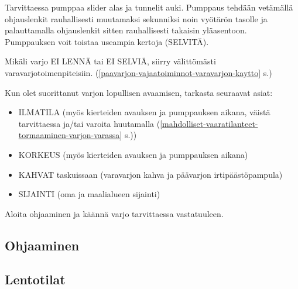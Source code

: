 \begin{multicols}{2}
Tarvittaessa pumppaa slider alas ja tunnelit auki. Pumppaus tehdään vetämällä ohjauslenkit rauhallisesti muutamaksi sekunniksi noin vyötärön tasolle ja palauttamalla ohjauslenkit sitten rauhallisesti takaisin yläasentoon. Pumppauksen voit toistaa useampia kertoja (SELVITÄ).  


Mikäli varjo EI LENNÄ tai EI SELVIÄ, siirry välittömästi varavarjotoimenpiteisiin. (\ref{paavarjon-vajaatoiminnot-varavarjon-kaytto} s.\pageref{paavarjon-vajaatoiminnot-varavarjon-kaytto}) 


Kun olet suorittanut varjon lopullisen avaamisen, tarkasta seuraavat asiat: 

\begin{framed}
\begin{itemize}
\item  ILMATILA (myös kierteiden avauksen ja pumppauksen aikana, väistä tarvittaessa ja/tai varoita huutamalla (\ref{mahdolliset-vaaratilanteet-tormaaminen-varjon-varassa} s.\pageref{mahdolliset-vaaratilanteet-tormaaminen-varjon-varassa})) 
\item  KORKEUS (myös kierteiden avauksen ja pumppauksen aikana) 
\item  KAHVAT taskuissaan (varavarjon kahva ja päävarjon irtipäästöpampula) 
\item  SIJAINTI (oma ja maalialueen sijainti) 
\end{itemize}
\end{framed}

Aloita ohjaaminen ja käännä varjo tarvittaessa vastatuuleen. 


\end{multicols}\pagebreak\begin{multicols}{2} 

\section{ Ohjaaminen }
\label{hyppytapahtuma-ohjaaminen}

\subsection{ Lentotilat }
\label{hyppytapahtuma-lentotilat}


\end{multicols}
